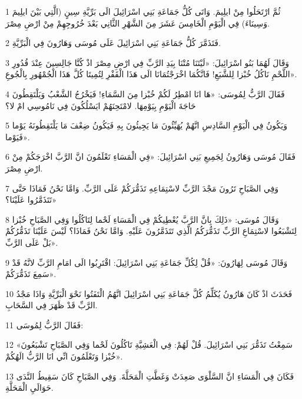 \par 1 ثُمَّ ارْتَحَلُوا مِنْ ايلِيمَ. وَاتَى كُلُّ جَمَاعَةِ بَنِي اسْرَائِيلَ الَى بَرِّيَّةِ سِينٍ (الَّتِي بَيْنَ ايلِيمَ وَسِينَاءَ) فِي الْيَوْمِ الْخَامِسَ عَشَرَ مِنَ الشَّهْرِ الثَّانِي بَعْدَ خُرُوجِهِمْ مِنْ ارْضِ مِصْرَ.
\par 2 فَتَذَمَّرَ كُلُّ جَمَاعَةِ بَنِي اسْرَائِيلَ عَلَى مُوسَى وَهَارُونَ فِي الْبَرِّيَّةِ.
\par 3 وَقَالَ لَهُمَا بَنُو اسْرَائِيلَ: «لَيْتَنَا مُتْنَا بِيَدِ الرَّبِّ فِي ارْضِ مِصْرَ اذْ كُنَّا جَالِسِينَ عِنْدَ قُدُورِ اللَّحْمِ نَاكُلُ خُبْزا لِلشَّبَعِ! فَانَّكُمَا اخْرَجْتُمَانَا الَى هَذَا الْقَفْرِ لِتُمِيتَا كُلَّ هَذَا الْجُمْهُورِ بِالْجُوعِ».
\par 4 فَقَالَ الرَّبُّ لِمُوسَى: «هَا انَا امْطِرُ لَكُمْ خُبْزا مِنَ السَّمَاءِ! فَيَخْرُجُ الشَّعْبُ وَيَلْتَقِطُونَ حَاجَةَ الْيَوْمِ بِيَوْمِهَا. لامْتَحِنَهُمْ ايَسْلُكُونَ فِي نَامُوسِي امْ لا؟
\par 5 وَيَكُونُ فِي الْيَوْمِ السَّادِسِ انَّهُمْ يُهَيِّئُونَ مَا يَجِيئُونَ بِهِ فَيَكُونُ ضِعْفَ مَا يَلْتَقِطُونَهُ يَوْما فَيَوْما».
\par 6 فَقَالَ مُوسَى وَهَارُونُ لِجَمِيعِ بَنِي اسْرَائِيلَ: «فِي الْمَسَاءِ تَعْلَمُونَ انَّ الرَّبَّ اخْرَجَكُمْ مِنْ ارْضِ مِصْرَ.
\par 7 وَفِي الصَّبَاحِ تَرُونَ مَجْدَ الرَّبِّ لاسْتِمَاعِهِ تَذَمُّرَكُمْ عَلَى الرَّبِّ. وَامَّا نَحْنُ فَمَاذَا حَتَّى تَتَذَمَّرُوا عَلَيْنَا؟»
\par 8 وَقَالَ مُوسَى: «ذَلِكَ بِانَّ الرَّبَّ يُعْطِيكُمْ فِي الْمَسَاءِ لَحْما لِتَاكُلُوا وَفِي الصَّبَاحِ خُبْزا لِتَشْبَعُوا لاسْتِمَاعِ الرَّبِّ تَذَمُّرَكُمُ الَّذِي تَتَذَمَّرُونَ عَلَيْهِ. وَامَّا نَحْنُ فَمَاذَا؟ لَيْسَ عَلَيْنَا تَذَمُّرُكُمْ بَلْ عَلَى الرَّبِّ».
\par 9 وَقَالَ مُوسَى لِهَارُونَ: «قُلْ لِكُلِّ جَمَاعَةِ بَنِي اسْرَائِيلَ: اقْتَرِبُوا الَى امَامِ الرَّبِّ لانَّهُ قَدْ سَمِعَ تَذَمُّرَكُمْ».
\par 10 فَحَدَثَ اذْ كَانَ هَارُونُ يُكَلِّمُ كُلَّ جَمَاعَةِ بَنِي اسْرَائِيلَ انَّهُمُ الْتَفَتُوا نَحْوَ الْبَرِّيَّةِ وَاذَا مَجْدُ الرَّبِّ قَدْ ظَهَرَ فِي السَّحَابِ.
\par 11 فَقَالَ الرَّبُّ لِمُوسَى:
\par 12 «سَمِعْتُ تَذَمُّرَ بَنِي اسْرَائِيلَ. قُلْ لَهُمْ: فِي الْعَشِيَّةِ تَاكُلُونَ لَحْما وَفِي الصَّبَاحِ تَشْبَعُونَ خُبْزا وَتَعْلَمُونَ انِّي انَا الرَّبُّ الَهُكُمْ».
\par 13 فَكَانَ فِي الْمَسَاءِ انَّ السَّلْوَى صَعِدَتْ وَغَطَّتِ الْمَحَلَّةَ. وَفِي الصَّبَاحِ كَانَ سَقِيطُ النَّدَى حَوَالَيِ الْمَحَلَّةِ.
